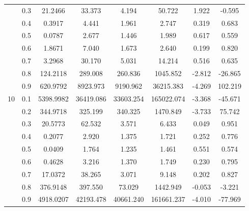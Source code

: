 \documentclass[11pt,a4paper]{report}
\begin{document}
\begin{longtable}{ | c | c || c | c | c | c | c | c | }
 & 0.3 & 21.2466 & 33.373 & 4.194 & 50.722 & 1.922 & -0.595 \\
 & 0.4 & 0.3917 & 4.441 & 1.961 & 2.747 & 0.319 & 0.683 \\
 & 0.5 & 0.0787 & 2.677 & 1.446 & 1.989 & 0.617 & 0.559 \\
 & 0.6 & 1.8671 & 7.040 & 1.673 & 2.640 & 0.199 & 0.820 \\
 & 0.7 & 3.2968 & 30.170 & 5.031 & 14.214 & 0.516 & 0.635 \\
 & 0.8 & 124.2118 & 289.008 & 260.836 & 1045.852 & -2.812 & -26.865 \\
 & 0.9 & 620.9792 & 8923.973 & 9190.962 & 36215.383 & -4.269 & 102.219 \\
 \hline
\multirow{9}{*}{10} & 0.1 & 5398.9982 & 36419.086 & 33603.254 & 165022.074 & -3.368 & -45.671 \\
 & 0.2 & 344.9718 & 325.199 & 340.325 & 1470.849 & -3.733 & 75.742 \\
 & 0.3 & 20.5773 & 62.532 & 3.571 & 6.433 & 0.049 & 0.951 \\
 & 0.4 & 0.2077 & 2.920 & 1.375 & 1.721 & 0.252 & 0.776 \\
 & 0.5 & 0.0409 & 1.764 & 1.235 & 1.461 & 0.551 & 0.574 \\
 & 0.6 & 0.4628 & 3.216 & 1.370 & 1.749 & 0.230 & 0.795 \\
 & 0.7 & 17.0372 & 38.265 & 3.071 & 9.148 & 0.202 & 0.827 \\
 & 0.8 & 376.9148 & 397.550 & 73.029 & 1442.949 & -0.053 & -3.221 \\
 & 0.9 & 4918.0207 & 42193.478 & 40661.240 & 161661.237 & -4.010 & -77.969 \\
 \hline
\hline
\end{longtable}
\end{document}
